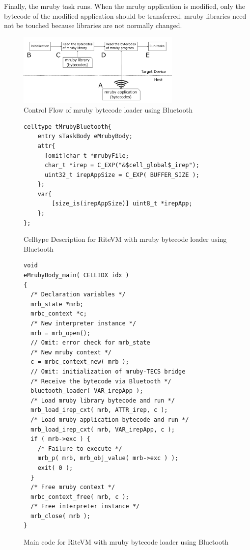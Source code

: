 \documentclass[conference,compsoc]{IEEEtran}
\begin{document}
Finally, the mruby task runs.
When the mruby application is modified, only the bytecode of the modified application should be transferred.
mruby libraries need not be touched because libraries are not normally changed.
\begin{figure}[t]
    \centering
    \includegraphics[width=8cm,clip]{figure/control_flow.pdf}
    \caption{Control Flow of mruby bytecode loader using Bluetooth}
    \label{fig:control_flow}
\end{figure}
\begin{figure}[t]
\centering
\begin{lstlisting}
celltype tMrubyBluetooth{
    entry sTaskBody eMrubyBody;
    attr{
      [omit]char_t *mrubyFile;
      char_t *irep = C_EXP("&$cell_global$_irep");
      uint32_t irepAppSize = C_EXP( BUFFER_SIZE );
    };
    var{
        [size_is(irepAppSize)] uint8_t *irepApp;
    };
};
\end{lstlisting}
\caption{Celltype Description for RiteVM with mruby bytecode loader using Bluetooth}
\label{celltype_mrubybluetooth}
\end{figure}
\begin{figure}[t]
\centering
\begin{lstlisting}
void
eMrubyBody_main( CELLIDX idx )
{
  /* Declaration variables */
  mrb_state *mrb;
  mrbc_context *c;
  /* New interpreter instance */
  mrb = mrb_open();
  // Omit: error check for mrb_state
  /* New mruby context */
  c = mrbc_context_new( mrb );
  // Omit: initialization of mruby-TECS bridge
  /* Receive the bytecode via Bluetooth */
  bluetooth_loader( VAR_irepApp );
  /* Load mruby library bytecode and run */
  mrb_load_irep_cxt( mrb, ATTR_irep, c );
  /* Load mruby application bytecode and run */
  mrb_load_irep_cxt( mrb, VAR_irepApp, c );
  if ( mrb->exc ) {
    /* Failure to execute */
    mrb_p( mrb, mrb_obj_value( mrb->exc ) );
    exit( 0 );
  }
  /* Free mruby context */
  mrbc_context_free( mrb, c );
  /* Free interpreter instance */
  mrb_close( mrb );
}

\end{lstlisting}
\caption{Main code for RiteVM with mruby bytecode loader using Bluetooth}
\label{maincode_mrubybluetooth}
\end{figure}
\end{document}
